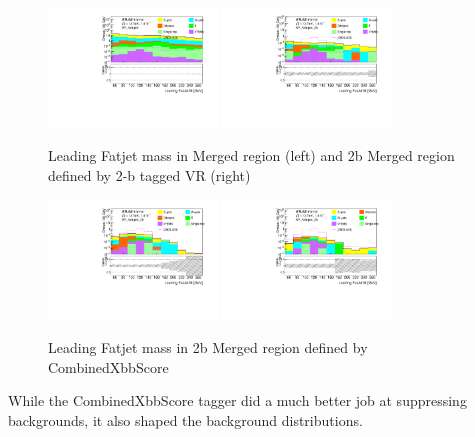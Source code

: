 \begin{figure}[h]
    \centering
    \includegraphics[width=0.4\textwidth]{appendices/fig/MC_MonoH_Nominal_SR_Merged_fatjets_m1_20GeV_LogY.pdf}
    \includegraphics[width=0.4\textwidth]{appendices/fig/MC_MonoH_Nominal_SR_Merged_2b_fatjets_m1_20GeV_LogY_vr.pdf}
    \caption{Leading Fatjet mass in Merged region (left) and 2b Merged region defined by 2-b tagged VR (right)}

    \label{fig:mj_before}
\end{figure}
\begin{figure}[h]
    \centering
    \includegraphics[width=0.4\textwidth]{appendices/fig/MC_MonoH_Nominal_SR_Merged_2b_fatjets_m1_20GeV_LogY_xbb.pdf}
    \includegraphics[width=0.4\textwidth]{appendices/fig/MC_MonoH_Nominal_SR_Merged_2b_fatjets_m1_20GeV_LogY_xbb_f0.pdf}
    \caption{Leading Fatjet mass in 2b Merged region defined by CombinedXbbScore}

    \label{fig:mj_after}
\end{figure}
\par While the CombinedXbbScore tagger did a much better job at suppressing backgrounds, it also shaped the background distributions. 

